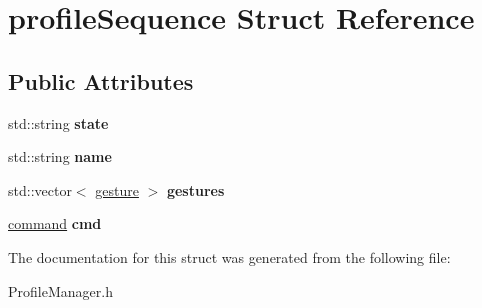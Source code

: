 \hypertarget{structprofile_sequence}{\section{profile\+Sequence Struct Reference}
\label{structprofile_sequence}
}
\subsection*{Public Attributes}
\begin{DoxyCompactItemize}
\item 
\hypertarget{structprofile_sequence_a7340db9d07b24cfce971ea637118d17d}{std\+::string {\bfseries state}}\label{structprofile_sequence_a7340db9d07b24cfce971ea637118d17d}

\item 
\hypertarget{structprofile_sequence_aa86a426828d07da3dd96e7989c709f3d}{std\+::string {\bfseries name}}\label{structprofile_sequence_aa86a426828d07da3dd96e7989c709f3d}

\item 
\hypertarget{structprofile_sequence_ad663fa61f1ba1ee143b19c3154fa99d9}{std\+::vector$<$ \hyperlink{structgesture}{gesture} $>$ {\bfseries gestures}}\label{structprofile_sequence_ad663fa61f1ba1ee143b19c3154fa99d9}

\item 
\hypertarget{structprofile_sequence_aa108287acf821469291f50a378827416}{\hyperlink{structcommand}{command} {\bfseries cmd}}\label{structprofile_sequence_aa108287acf821469291f50a378827416}

\end{DoxyCompactItemize}


The documentation for this struct was generated from the following file\+:\begin{DoxyCompactItemize}
\item 
Profile\+Manager.\+h\end{DoxyCompactItemize}
